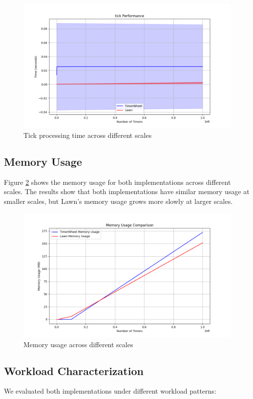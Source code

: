 \documentclass[conference]{IEEEtran}
\begin{document}
\begin{figure}[ht]
	\centering
	\includegraphics[width=0.9\linewidth]{tick.png}
	\caption{Tick processing time across different scales}
	\label{fig:tick}
\end{figure}

\subsection{Memory Usage}
Figure \ref{fig:memory} shows the memory usage for both implementations across different scales. The results show that both implementations have similar memory usage at smaller scales, but Lawn's memory usage grows more slowly at larger scales.

\begin{figure}[ht]
	\centering
	\includegraphics[width=0.9\linewidth]{memory.png}
	\caption{Memory usage across different scales}
	\label{fig:memory}
\end{figure}

\subsection{Workload Characterization}
We evaluated both implementations under different workload patterns:
\end{document}
